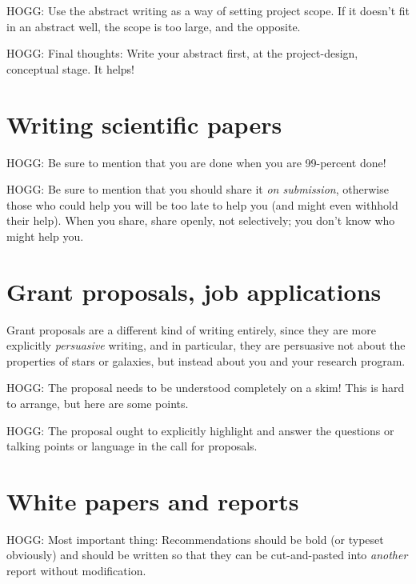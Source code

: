 \documentclass[letterpaper]{book}
\begin{document}
HOGG: Use the abstract writing as a way of setting project scope.
If it doesn't fit in an abstract well, the scope is too large, and the opposite.

HOGG: Final thoughts: Write your abstract first, at the project-design, conceptual stage. It helps!

\chapter{Writing scientific papers}\label{ch:papers}

HOGG: Be sure to mention that you are done when you are 99-percent done!

HOGG: Be sure to mention that you should share it \emph{on submission}, otherwise those who could help you will be too late to help you (and might even withhold their help). When you share, share openly, not selectively; you don't know who might help you.

\chapter{Grant proposals, job applications}


Grant proposals are a different kind of writing entirely, since they are more explicitly \emph{persuasive} writing, and in particular, they are persuasive not about the properties of stars or galaxies, but instead about you and your research program.

HOGG: The proposal needs to be understood completely on a skim! This is hard to arrange, but here are some points.

HOGG: The proposal ought to explicitly highlight and answer the questions or talking points or language in the call for proposals.

\chapter{White papers and reports}

HOGG: Most important thing: Recommendations should be bold (or typeset obviously) and should be written so that they can be cut-and-pasted into \emph{another} report without modification.
\end{document}
